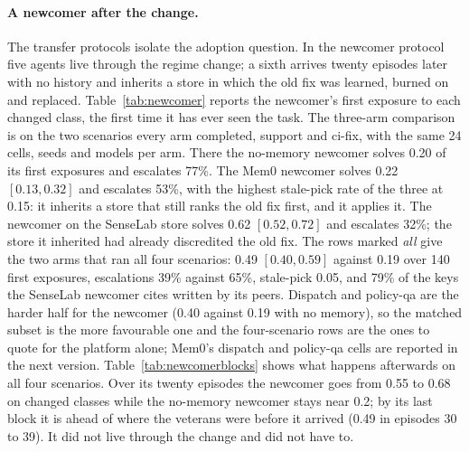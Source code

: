 \documentclass[11pt]{article}
\begin{document}
\paragraph{A newcomer after the change.} The transfer protocols isolate the adoption question.
In the newcomer protocol five agents live through the regime change; a sixth arrives twenty
episodes later with no history and inherits a store in which the old fix was learned, burned on
and replaced. Table~\ref{tab:newcomer} reports the newcomer's first exposure to each changed
class, the first time it has ever seen the task. The three-arm comparison is on the two
scenarios every arm completed, support and ci-fix, with the same 24 cells, seeds and models per
arm. There the no-memory newcomer solves 0.20 of its first exposures and escalates 77\%. The
Mem0 newcomer solves 0.22 $[0.13, 0.32]$ and escalates 53\%, with the highest stale-pick rate
of the three at 0.15: it inherits a store that still ranks the old fix first, and it applies
it. The newcomer on the SenseLab store solves 0.62 $[0.52, 0.72]$ and escalates
32\%; the store it inherited had already discredited the old fix. The rows marked \emph{all}
give the two arms that ran all four scenarios: 0.49 $[0.40, 0.59]$ against 0.19 over 140 first
exposures, escalations 39\% against 65\%, stale-pick 0.05, and 79\% of the keys the
SenseLab newcomer cites written by its peers. Dispatch and policy-qa are the harder
half for the newcomer (0.40 against 0.19 with no memory), so the matched subset is the more
favourable one and the four-scenario rows are the ones to quote for the platform alone; Mem0's
dispatch and policy-qa cells are reported in the next version. Table~\ref{tab:newcomerblocks}
shows what happens afterwards on all four scenarios. Over its twenty episodes the newcomer goes
from 0.55 to 0.68 on changed classes while the no-memory newcomer stays near 0.2; by its last
block it is ahead of where the veterans were before it arrived (0.49 in episodes 30 to 39). It
did not live through the change and did not have to.
\end{document}
